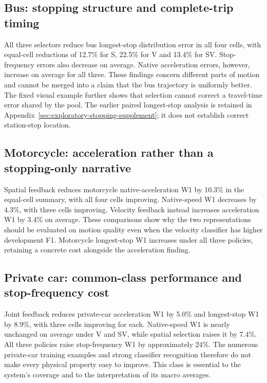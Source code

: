 

\subsection{Bus: stopping structure and complete-trip timing}
All three selectors reduce bus longest-stop distribution error in all four cells, with equal-cell reductions of 12.7\% for S, 22.5\% for V and 13.4\% for SV. Stop-frequency errors also decrease on average. Native acceleration errors, however, increase on average for all three. These findings concern different parts of motion and cannot be merged into a claim that the bus trajectory is uniformly better. The fixed visual example further shows that selection cannot correct a travel-time error shared by the pool. The earlier paired longest-stop analysis is retained in Appendix~\ref{sec:exploratory-stopping-supplement}; it does not establish correct station-stop location.

\subsection{Motorcycle: acceleration rather than a stopping-only narrative}
Spatial feedback reduces motorcycle native-acceleration W1 by 10.3\% in the equal-cell summary, with all four cells improving. Native-speed W1 decreases by 4.3\%, with three cells improving. Velocity feedback instead increases acceleration W1 by 3.4\% on average. These comparisons show why the two representations should be evaluated on motion quality even when the velocity classifier has higher development F1. Motorcycle longest-stop W1 increases under all three policies, retaining a concrete cost alongside the acceleration finding.

\subsection{Private car: common-class performance and stop-frequency cost}
Joint feedback reduces private-car acceleration W1 by 5.0\% and longest-stop W1 by 8.9\%, with three cells improving for each. Native-speed W1 is nearly unchanged on average under V and SV, while spatial selection raises it by 7.4\%. All three policies raise stop-frequency W1 by approximately 24\%. The numerous private-car training examples and strong classifier recognition therefore do not make every physical property easy to improve. This class is essential to the system's coverage and to the interpretation of its macro averages.


